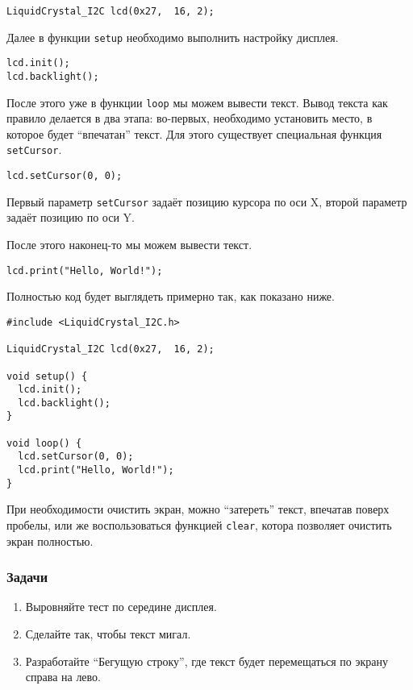 \documentclass[../sparc.tex]{subfiles}
\begin{document}
\begin{verbatim}
LiquidCrystal_I2C lcd(0x27,  16, 2);
\end{verbatim}

Далее в функции \texttt{setup} необходимо выполнить настройку дисплея.

\begin{verbatim}
lcd.init();
lcd.backlight();
\end{verbatim}

После этого уже в функции \texttt{loop} мы можем вывести текст.  Вывод текста
как правило делается в два этапа: во-первых, необходимо установить место, в
которое будет ``впечатан'' текст.  Для этого существует специальная функция
\texttt{setCursor}.

\begin{verbatim}
lcd.setCursor(0, 0);
\end{verbatim}

Первый параметр \texttt{setCursor} задаёт позицию курсора по оси X, второй
параметр задаёт позицию по оси Y.

После этого наконец-то мы можем вывести текст.

\begin{verbatim}
lcd.print("Hello, World!");
\end{verbatim}

Полностью код будет выглядеть примерно так, как показано ниже.

\begin{verbatim}
#include <LiquidCrystal_I2C.h>

LiquidCrystal_I2C lcd(0x27,  16, 2);

void setup() {
  lcd.init();
  lcd.backlight();
}

void loop() {
  lcd.setCursor(0, 0);
  lcd.print("Hello, World!");
}
\end{verbatim}

При необходимости очистить экран, можно ``затереть'' текст, впечатав поверх
пробелы, или же воспользоваться функцией \texttt{clear}, котора позволяет
очистить экран полностью.

\subsubsection{Задачи}
\begin{enumerate}
\item Выровняйте тест по середине дисплея.
\item Сделайте так, чтобы текст мигал.
\item Разработайте ``Бегущую строку'', где текст будет перемещаться по экрану
  справа на лево.
\end{enumerate}
\end{document}

